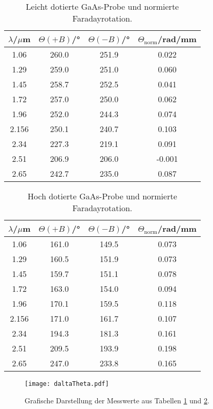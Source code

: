 \begin{table}
  \centering
  \caption{Leicht dotierte GaAs-Probe und normierte Faradayrotation.}
  \label{tab:tief}
  \begin{tabular}{c | c | c | c}
    \toprule
    $\lambda$/$\mu$m & $\Theta(+B)$/° & $\Theta(-B)$/°& $\Theta_{\text{norm}}$/rad/mm \\
    \midrule
    1.06 & 260.0 & 251.9 & 0.022 \\
    1.29 & 259.0 & 251.0 & 0.060 \\
    1.45 & 258.7 & 252.5 & 0.041 \\
    1.72 & 257.0 & 250.0 & 0.062 \\
    1.96 & 252.0 & 244.3 & 0.074 \\
    2.156 & 250.1 & 240.7 & 0.103 \\
    2.34 & 227.3 & 219.1 & 0.091 \\
    2.51 & 206.9 & 206.0 & -0.001 \\
    2.65 & 242.7 & 235.0 & 0.087 \\
    \bottomrule
  \end{tabular}
\end{table}
\FloatBarrier

\begin{table}
  \centering
  \caption{Hoch dotierte GaAs-Probe und normierte Faradayrotation.}
  \label{tab:hoch}
  \begin{tabular}{c | c | c | c}
    \toprule
    $\lambda$/$\mu$m & $\Theta(+B)$/° & $\Theta(-B)$/°& $\Theta_{\text{norm}}$/rad/mm \\
    \midrule
    1.06 & 161.0 & 149.5 & 0.073 \\
    1.29 & 160.5 & 151.9 & 0.073 \\
    1.45 & 159.7 & 151.1 & 0.078 \\
    1.72 & 163.0 & 154.0 & 0.094 \\
    1.96 & 170.1 & 159.5 & 0.118 \\
    2.156 & 171.0 & 161.7 & 0.107 \\
    2.34 & 194.3 & 181.3 & 0.161 \\
    2.51 & 209.5 & 193.9 & 0.198 \\
    2.65 & 247.0 & 233.8 & 0.165 \\
    \bottomrule
  \end{tabular}
\end{table}
\FloatBarrier

\begin{figure}
  \centering
  \texttt{[image: daltaTheta.pdf]}
  \caption{Grafische Darstellung der Messwerte aus Tabellen \ref{tab:tief} und \ref{tab:hoch}.}
  \label{abb:delta}
\end{figure}
\FloatBarrier